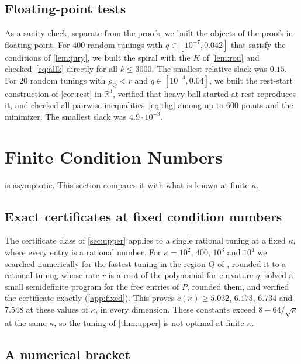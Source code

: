 \documentclass[11pt, a4paper]{article}
\theoremstyle{definition}
\newcommand{\R}{\mathbb{R}}
\begin{document}
\subsection{Floating-point tests}

As a sanity check, separate from the proofs, we built the objects of the proofs in floating point. For $400$ random
tunings with $q\in[10^{-7},0.042]$ that satisfy the conditions of \cref{lem:jury}, we built the spiral with the $K$ of
\cref{lem:rou} and checked~\eqref{eq:allk} directly for all $k\le3000$. The smallest relative slack was $0.15$. For $20$
random tunings with $\rho_Q<r$ and $q\in[10^{-4},0.04]$, we built the rest-start construction of \cref{cor:rest} in
$\R^3$, verified that heavy-ball started at rest reproduces it, and checked all pairwise inequalities~\eqref{eq:thg}
among up to $600$ points and the minimizer. The smallest slack was $4.9\cdot10^{-3}$.

\section{Finite Condition Numbers}
\label{sec:finite}

 is asymptotic. This section compares it with what is known at finite $\kappa$.

\subsection{Exact certificates at fixed condition numbers}

The certificate class of \cref{sec:upper} applies to a single rational tuning at a fixed $\kappa$, where every entry
is a rational number. For $\kappa=10^2$, $400$, $10^3$ and $10^4$ we searched numerically for the fastest tuning in the
region $Q$ of \citet{pasechniuk2026two}, rounded it to a rational tuning whose rate $r$ is a root of the polynomial for
curvature $q$, solved a small semidefinite program for the free entries of $P$, rounded them, and verified the
certificate exactly (\cref{app:fixed}). This proves $c(\kappa)\ge5.032$, $6.173$, $6.734$ and $7.548$ at these values
of $\kappa$, in every dimension. These constants exceed $8-64/\sqrt\kappa$ at the same $\kappa$, so the tuning of
\cref{thm:upper} is not optimal at finite $\kappa$.

\subsection{A numerical bracket}
\end{document}
